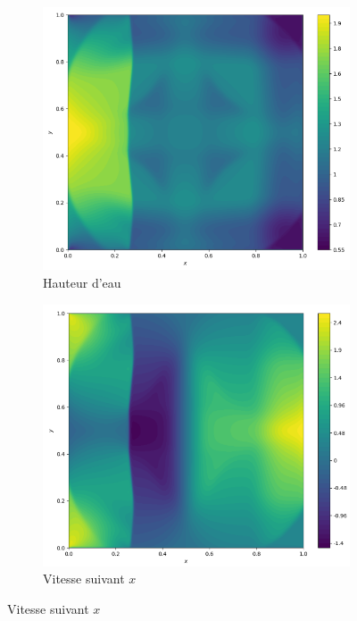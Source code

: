 \documentclass[
	french,
	11pt, %
]{fphw}
\begin{document}
\begin{figure}[H]
	\centering
	\begin{subfigure}{0.32\textwidth}
		\centering
		\includegraphics[width=\textwidth,height=0.85\textwidth]{Bord2h.png}
		\caption{Hauteur d'eau}
		\label{fig:Bord2h}
	\end{subfigure}
	\begin{subfigure}{0.32\textwidth}
		\centering
		\includegraphics[width=\textwidth,height=0.85\textwidth]{Bord2u.png}
		\caption{Vitesse suivant $x$}

\end{subfigure}
\end{figure}
\end{document}
